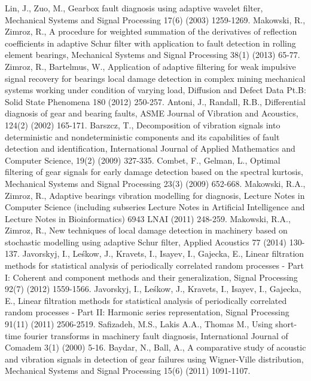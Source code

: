 \documentclass[3p,times]{elsarticle}
\begin{document}
\begin{thebibliography}{00}
	Lin, J., Zuo, M.,  Gearbox fault diagnosis using adaptive wavelet filter, Mechanical  Systems and Signal Processing 17(6) (2003) 1259-1269.
	Makowski, R., Zimroz, R., A procedure for weighted summation of the derivatives of reflection coefficients in adaptive Schur filter with application to fault detection in rolling element bearings, Mechanical Systems and Signal Processing 38(1) (2013) 65-77.
	Zimroz, R., Bartelmus, W., Application of adaptive filtering for weak impulsive signal recovery for bearings local damage detection in complex mining mechanical systems working under condition of varying load, Diffusion and Defect Data Pt.B: Solid State Phenomena 180 (2012) 250-257.
	Antoni, J., Randall, R.B., Differential diagnosis of gear and bearing faults, ASME Journal of Vibration and Acoustics, 124(2) (2002) 165-171.
	Barszcz, T., Decomposition of vibration signals into deterministic and nondeterministic components and its capabilities of fault detection and identification, International Journal of Applied Mathematics and Computer Science, 19(2) (2009) 327-335.
	Combet, F., Gelman, L., Optimal filtering of gear signals for early damage detection based on the spectral kurtosis, Mechanical Systems and Signal Processing 23(3) (2009) 652-668.
	Makowski, R.A., Zimroz, R., Adaptive bearings vibration modelling for diagnosis, Lecture Notes in Computer Science (including subseries Lecture Notes in Artificial Intelligence and Lecture Notes in Bioinformatics) 6943 LNAI (2011) 248-259.
	Makowski, R.A., Zimroz, R., New techniques of local damage detection in machinery based on stochastic modelling using adaptive Schur filter, Applied Acoustics 77 (2014) 130-137.
	Javorskyj, I., Le{\'s}kow, J., Kravets, I., Isayev, I., Gajecka, E., Linear filtration methods for statistical analysis of periodically correlated random processes - Part I: Coherent and component methods and their generalization, Signal Processing 92(7) (2012) 1559-1566.
	Javorskyj, I., Le{\'s}kow, J., Kravets, I., Isayev, I., Gajecka, E., Linear filtration methods for statistical analysis of periodically correlated random processes - Part II: Harmonic series representation, Signal Processing 91(11) (2011) 2506-2519.
	Safizadeh, M.S., Lakis A.A., Thomas M.,  Using short-time fourier transforms in machinery fault diagnosis, International Journal of Comadem 3(1) (2000) 5-16.
	Baydar, N., Ball, A., A comparative study of acoustic and vibration signals in detection of gear failures using Wigner-Ville distribution, Mechanical Systems and Signal Processing 15(6) (2011) 1091-1107.

\end{thebibliography}
\end{document}
